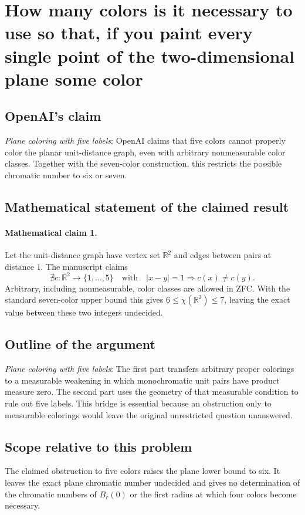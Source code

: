 \documentclass[11pt]{article}
\begin{document}
\section*{How many colors is it necessary to use so that, if you paint every single point of the two-dimensional plane some color}

\subsection{OpenAI's claim}
\textit{Plane coloring with five labels}: OpenAI claims that five colors cannot properly color the planar unit-distance graph, even with arbitrary nonmeasurable color classes. Together with the seven-color construction, this restricts the possible chromatic number to six or seven.

\subsection{Mathematical statement of the claimed result}
\paragraph{Mathematical claim 1.} Let the unit-distance graph have vertex set $\mathbb R^2$ and edges between pairs at distance $1$. The manuscript claims \[\nexists c:\mathbb R^2\to\{1,\ldots,5\}\quad\text{with}\quad|x-y|=1\Longrightarrow c(x)\ne c(y).\] Arbitrary, including nonmeasurable, color classes are allowed in ZFC. With the standard seven-color upper bound this gives $6\le\chi(\mathbb R^2)\le7$, leaving the exact value between these two integers undecided.

\subsection{Outline of the argument}
\textit{Plane coloring with five labels}: The first part transfers arbitrary proper colorings to a measurable weakening in which monochromatic unit pairs have product measure zero. The second part uses the geometry of that measurable condition to rule out five labels. This bridge is essential because an obstruction only to measurable colorings would leave the original unrestricted question unanswered.

\subsection{Scope relative to this problem}
The claimed obstruction to five colors raises the plane lower bound to six. It leaves the exact plane chromatic number undecided and gives no determination of the chromatic numbers of $B_r(0)$ or the first radius at which four colors become necessary.
\end{document}
